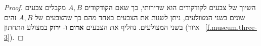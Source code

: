 \begin{proof}
%
%  
%
%
%
%
%
%  
%
%
%
השיוך של צבעים לקודקודים הוא שרירותי, כך שאם הקודקודים 
$A,B$
מקבלים צבעים שונים בשני המצולעים, ניתן לשנות את הצבעים באחד מהם כך שהצבעים של 
$A,B$
זהים בשני המצולעים. נחליף את הצבעים
\textbf{אדום}
ו-%
\textbf{ירוק}
במצולע התחתון (איור%
~\ref{f.museum.three-3}).


\end{proof}
